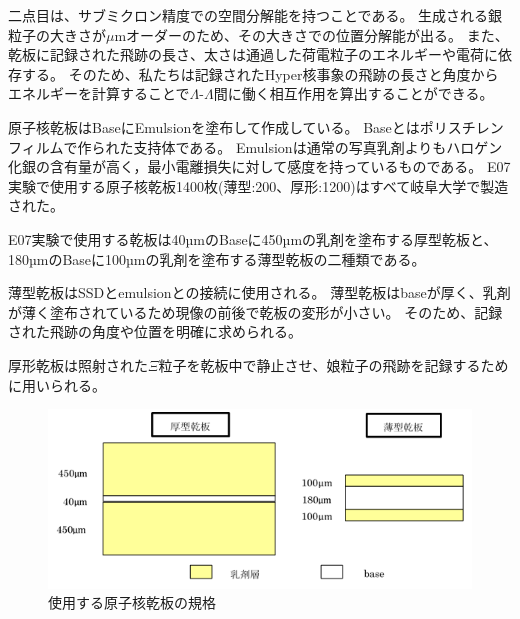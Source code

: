 \documentclass[12pt,a4paper]{jarticle}
\begin{document}
二点目は、サブミクロン精度での空間分解能を持つことである。
生成される銀粒子の大きさが$\mu$mオーダーのため、その大きさでの位置分解能が出る。
また、乾板に記録された飛跡の長さ、太さは通過した荷電粒子のエネルギーや電荷に依存する。
そのため、私たちは記録されたHyper核事象の飛跡の長さと角度からエネルギーを計算することで$\Lambda$-$\Lambda$間に働く相互作用を算出することができる。
\par
原子核乾板はBaseにEmulsionを塗布して作成している。
Baseとはポリスチレンフィルムで作られた支持体である。
Emulsionは通常の写真乳剤よりもハロゲン化銀の含有量が高く，最小電離損失に対して感度を持っているものである。
E07実験で使用する原子核乾板1400枚(薄型:200、厚形:1200)はすべて岐阜大学で製造された。
\par
E07実験で使用する乾板は40µmのBaseに450µmの乳剤を塗布する厚型乾板と、180µmのBaseに100µmの乳剤を塗布する薄型乾板の二種類である。
\par
薄型乾板はSSDとemulsionとの接続に使用される。
薄型乾板はbaseが厚く、乳剤が薄く塗布されているため現像の前後で乾板の変形が小さい。
そのため、記録された飛跡の角度や位置を明確に求められる。
\par
厚形乾板は照射された$\Xi$粒子を乾板中で静止させ、娘粒子の飛跡を記録するために用いられる。
\par
\begin{figure}[htbp]
    \begin{center}
     \includegraphics[width=140mm]{emulsionorder.png}
    \end{center}
    \caption{使用する原子核乾板の規格\label{fig:emulsionorder}}
\end{figure}
\end{document}
